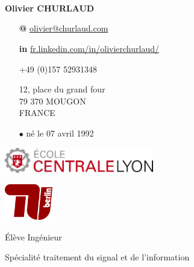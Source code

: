\documentclass[skip,a4paper]{article}
\begin{document}
\fontsize{8.5}{9.5}
\selectfont

\begin{minipage}[c]{\linewidth}
	\begin{minipage}[c][4cm]{2.6cm}
		~\\~\\
		\vfill
		~
	\end{minipage}
	\begin{minipage}[c][4cm]{5.5cm}
		\textbf{Olivier CHURLAUD}

		\begin{itemize}[itemsep=0.5ex,leftmargin=3ex]
			\footnotesize
			\item[\bfseries @] \url{olivier@churlaud.com}
			\item[\bfseries \color{blue} in] {\scriptsize\url{ fr.linkedin.com/in/olivierchurlaud/}}
			\item[\Telefon] +49 (0)157 52931348
			\item[\Letter] 12, place du grand four \\
			79 370 MOUGON \\ 
			FRANCE
			\item[$\bullet$] né le 07 avril 1992
		\end{itemize}
	\end{minipage}
	\begin{minipage}[c][4cm]{10cm}
		\begin{minipage}[c]{7.10cm}
			\includegraphics[width=6.5cm]{img/ecl}
		\end{minipage}
		\hfill
		\begin{minipage}[c]{2.5cm}
			\includegraphics[width=2.1cm]{img/tuberlin}
		\end{minipage}
		
		\vfill
		
		\centering
		{
			\setlength{\parskip}{10pt plus 1pt minus 1pt}
			{\LARGE \'Elève Ingénieur}
			
			{\Large Spécialité traitement du signal et de l'information}
		}
	\end{minipage}
\end{minipage}
\end{document}
